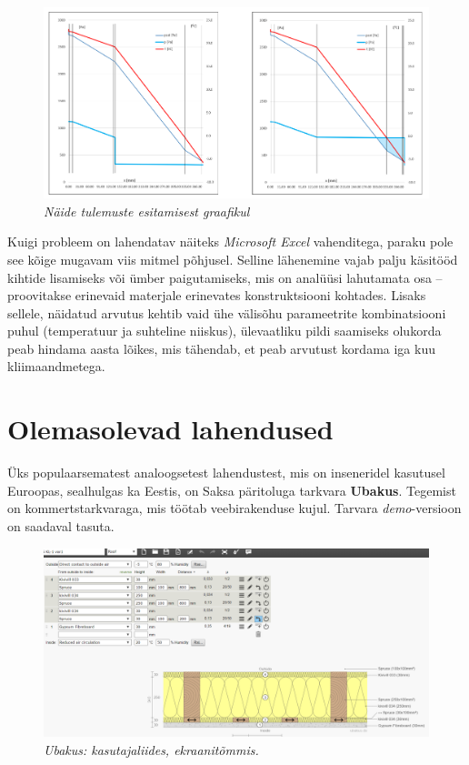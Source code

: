 \begin{figure}[ht]
    \centering
    \includegraphics[width=.8\textwidth]{figures/problem_statement/05_excel_grafic_sample.png}
    \caption[Näide niiskustehnilise analüüsi tulemuste esitamisest graafikul]{\textit{Näide tulemuste esitamisest graafikul}}
    \label{fig:excel_graph_sample}
\end{figure}

Kuigi probleem on lahendatav näiteks \textit{Microsoft Excel} vahenditega, paraku pole see kõige mugavam viis
mitmel põhjusel. Selline lähenemine vajab palju käsitööd kihtide lisamiseks või ümber paigutamiseks, mis on analüüsi lahutamata
osa -- proovitakse erinevaid materjale erinevates konstruktsiooni kohtades. Lisaks sellele, näidatud arvutus kehtib vaid ühe 
välisõhu parameetrite kombinatsiooni puhul (temperatuur ja suhteline niiskus), ülevaatliku pildi saamiseks olukorda peab hindama
 aasta lõikes, mis tähendab, et  peab arvutust kordama iga kuu kliimaandmetega.

\section{Olemasolevad lahendused}
\label{chapters:problem_statement_existing_solutions}
Üks populaarsematest analoogsetest lahendustest, mis on inseneridel kasutusel Euroopas, sealhulgas ka Eestis, on Saksa päritoluga tarkvara \textbf{Ubakus}. 
Tegemist on kommertstarkvaraga, mis töötab veebirakenduse kujul. Tarvara \textit{demo}-versioon on saadaval tasuta.
\begin{figure}[ht]
    \centering
    \includegraphics[width=1\textwidth]{figures/problem_statement/01_ubakus.png}
    \caption[Ubakus tarkvara katutajaliides, ekraanitõmmis]{\textit{Ubakus: kasutajaliides, ekraanitõmmis.}}
    \label{fig:ubakus_sample}
\end{figure}

